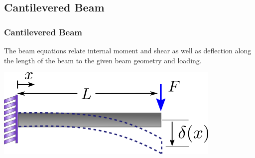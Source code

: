 \documentclass[fleqn]{beamer} %
\newcommand{\sectionIsubsectionIIItitle}{Cantilevered Beam}
\begin{document}
		\subsection{\sectionIsubsectionIIItitle}\label{sectionIsubsectionIII}
			\begin{frame} 
				\frametitle{\sectionIsubsectionIIItitle} %


				The beam equations relate internal moment and shear as well as deflection along the length of the beam to the given beam geometry and loading.  

				\begin{multicols}{2}

				\includegraphics[scale=.50]{images/cantelever_deflection.png}

				\vspace{10mm}
				\hspccc{} \vspc
				\hspccc{} \vspccc
				\hspccc{} \vspc
				\hspccc{}

				\end{multicols}

				\bigskip

			\end{frame}	
\end{document}
